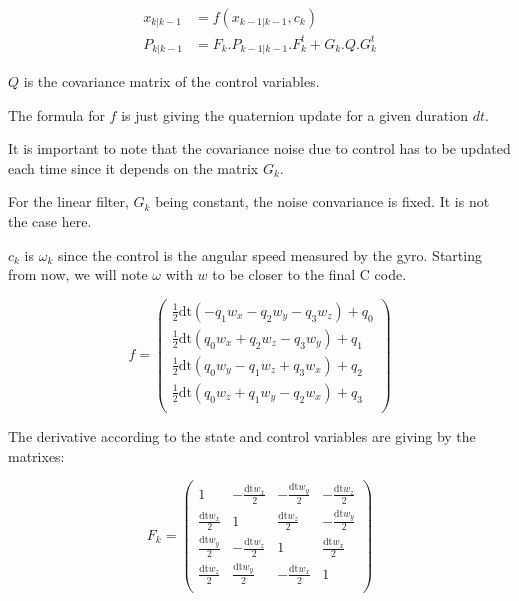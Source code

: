 \documentclass[titlepage,a4,12pt]{article}
\numberwithin{equation}{subsection}
\newcommand{\curr}[1]{#1_{k-1|k-1}}
\newcommand{\before}[1]{#1_{k|k-1}}
\begin{document}
\begin{align}\label{eq:predict}
\before{x} &= f(\curr{x},c_k)\\
\before{P} &= F_k . \curr{P} . F_k^t + G_k . Q . G_k^t
\end{align}

$Q$ is the covariance matrix of the control variables.

The formula for $f$ is just giving the quaternion update for a given duration $dt$.

It is important to note that the covariance noise due to control has to be updated each time since it depends on the matrix $G_k$.

For the linear filter, $G_k$ being constant, the noise convariance is fixed. It is not the case here.

$c_k$ is $\omega_k$ since the control is the angular speed measured by the gyro. Starting from now, we will note $\omega$ with $w$ to be closer to the final C code.

\begin{equation}\label{eq:f}
f = \left(
\begin{array}{c}
 \frac{1}{2} \text{dt} (-q_1 {w_x}-q_2 {w_y}-q_3 {w_z})+q_0 \\
 \frac{1}{2} \text{dt} (q_0 {w_x}+q_2 {w_z}-q_3 {w_y})+q_1 \\
 \frac{1}{2} \text{dt} (q_0 {w_y}-q_1 {w_z}+q_3 {w_x})+q_2 \\
 \frac{1}{2} \text{dt} (q_0 {w_z}+q_1 {w_y}-q_2 {w_x})+q_3 \\
\end{array}
\right)
\end{equation}

The derivative according to the state and control variables are giving by the matrixes:

\begin{equation}\label{eq:Fmatrix}
F_k = \left(
\begin{array}{cccc}
 1 & -\frac{\text{dt} {w_x}}{2} & -\frac{\text{dt} {w_y}}{2} & -\frac{\text{dt} {w_z}}{2} \\
 \frac{\text{dt} {w_x}}{2} & 1 & \frac{\text{dt} {w_z}}{2} & -\frac{\text{dt} {w_y}}{2} \\
 \frac{\text{dt} {w_y}}{2} & -\frac{\text{dt} {w_z}}{2} & 1 & \frac{\text{dt} {w_x}}{2} \\
 \frac{\text{dt} {w_z}}{2} & \frac{\text{dt} {w_y}}{2} & -\frac{\text{dt} {w_x}}{2} & 1 \\
\end{array}
\right)
\end{equation}
\end{document}
